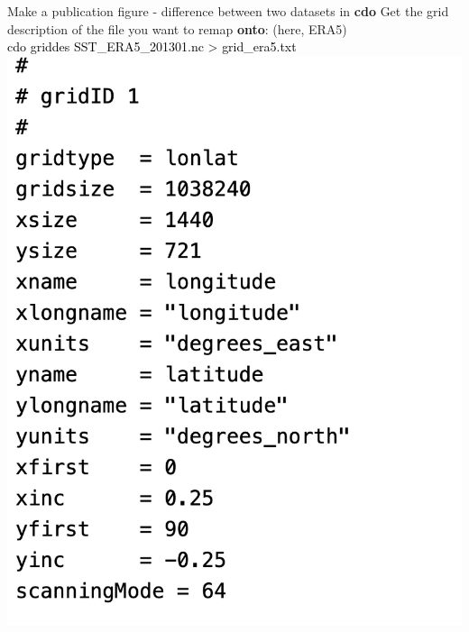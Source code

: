 \begin{frame}{\insertsectionnumber{ |} Make a publication figure - difference between two datasets in \textbf{cdo}}
    Get the grid description of the file you want to remap \textbf{onto}: (here, ERA5)\\
        \vspace{0.5cm}
    \textcolor{black}{cdo griddes SST\_ERA5\_201301.nc > grid\_era5.txt}\\
        \vspace{0.5cm}
    \includegraphics[scale=0.35]{images/Script5_step0.png}
\end{frame}
  
